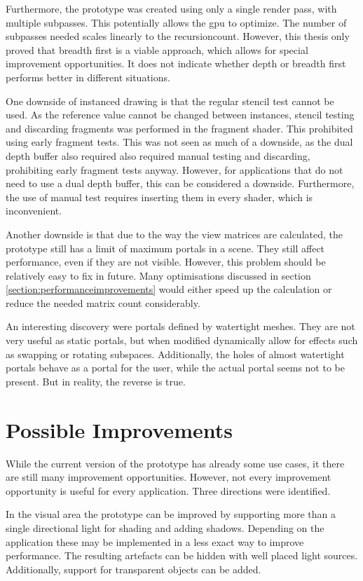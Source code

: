 Furthermore, the prototype was created using only a single render pass, with multiple subpasses. This potentially allows the \gls{gpu} to optimize. The number of subpasses needed scales linearly to the \gls{recursioncount}. However, this thesis only proved that breadth first is a viable approach, which allows for special improvement opportunities. It does not indicate whether depth or breadth first performs better in different situations.

One downside of instanced drawing is that the regular stencil test cannot be used. As the reference value cannot be changed between instances, stencil testing and discarding fragments was performed in the fragment shader. This prohibited using early fragment tests. This was not seen as much of a downside, as the dual depth buffer also required also required manual testing and discarding, prohibiting early fragment tests anyway. However, for applications that do not need to use a dual depth buffer, this can be considered a downside. Furthermore, the use of manual test requires inserting them in every shader, which is inconvenient.

Another downside is that due to the way the view matrices are calculated, the prototype still has a limit of maximum portals in a scene. They still affect performance, even if they are not visible. However, this problem should be relatively easy to fix in future. Many optimisations discussed in section \ref{section:performanceimprovements} would either speed up the calculation or reduce the needed matrix count considerably.

An interesting discovery were portals defined by watertight meshes. They are not very useful as static portals, but when modified dynamically allow for effects such as swapping or rotating subspaces. Additionally, the holes of almost watertight portals behave as a portal for the user, while the actual portal seems not to be present. But in reality, the reverse is true.


\section{Possible Improvements}

While the current version of the prototype has already some use cases, it there are still many improvement opportunities. However, not every improvement opportunity is useful for every application. Three directions were identified.

In the visual area the prototype can be improved by supporting more than a single directional light for shading and adding shadows. Depending on the application these may be implemented in a less exact way to improve performance. The resulting artefacts can be hidden with well placed light sources. Additionally, support for transparent objects can be added.

